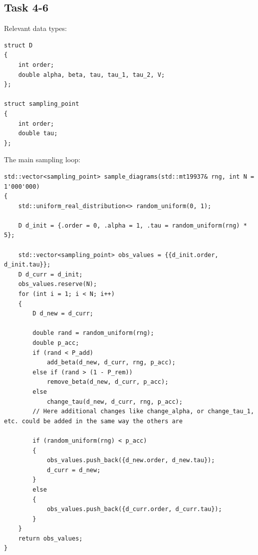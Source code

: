 \documentclass[a4paper, 11pt]{article}          %
\begin{document}
    \begin{landscape}
    \subsection{Task 4-6}\label{sec:task_4-6}

    Relevant data types:

    \begin{lstlisting}[style=cppstyle, caption={Diagram data structures}, label={lst:diagram_structures}]
struct D
{
    int order;
    double alpha, beta, tau, tau_1, tau_2, V;
};

struct sampling_point
{
    int order;
    double tau;
};
    \end{lstlisting}

    The main sampling loop:

    \begin{lstlisting}[style=cppstyle, caption={The function that actually samples diagrams. obs\_values stores the sampling points that are later used for blocking. There is a d\_curr which always stores the current full diagram to save memory. Based on the probabilities provided one of the changes will be executed and it will calculate the acceptance probability internally based on the kind of change and just return the acceptance probability p\_acc, based on which the move is accepted or rejected }, label={lst:sample_diagrams}]
        std::vector<sampling_point> sample_diagrams(std::mt19937& rng, int N = 1'000'000)
{
    std::uniform_real_distribution<> random_uniform(0, 1);

    D d_init = {.order = 0, .alpha = 1, .tau = random_uniform(rng) * 5};

    std::vector<sampling_point> obs_values = {{d_init.order, d_init.tau}};
    D d_curr = d_init;
    obs_values.reserve(N);
    for (int i = 1; i < N; i++)
    {
        D d_new = d_curr;

        double rand = random_uniform(rng);
        double p_acc;
        if (rand < P_add)
            add_beta(d_new, d_curr, rng, p_acc);
        else if (rand > (1 - P_rem))
            remove_beta(d_new, d_curr, p_acc);
        else
            change_tau(d_new, d_curr, rng, p_acc);
        // Here additional changes like change_alpha, or change_tau_1, etc. could be added in the same way the others are

        if (random_uniform(rng) < p_acc)
        {
            obs_values.push_back({d_new.order, d_new.tau});
            d_curr = d_new;
        }
        else
        {
            obs_values.push_back({d_curr.order, d_curr.tau});
        }
    }
    return obs_values;
}
    \end{lstlisting}


\end{landscape}
\end{document}
